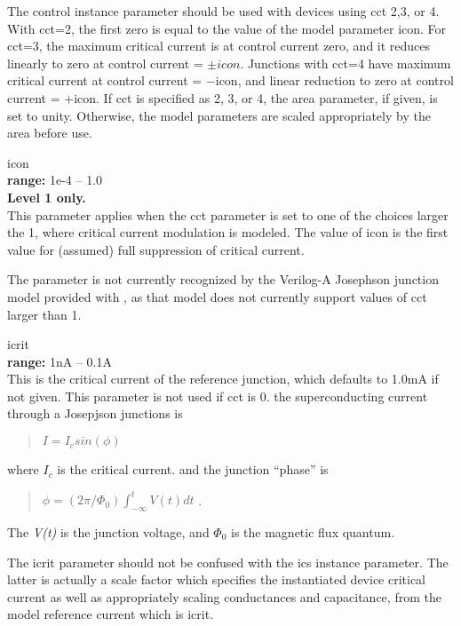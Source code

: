 \begin{description}
The {\vt control} instance parameter should be used with devices using
{\vt cct} 2,3, or 4.  With {\vt cct=2}, the first zero is equal to the
value of the model parameter {\vt icon}.  For {\vt cct=3}, the maximum
critical current is at control current zero, and it reduces linearly
to zero at control current = $\pm icon$.  Junctions with {\vt cct=4}
have maximum critical current at control current = $-${\vt icon}, and
linear reduction to zero at control current = $+${\vt icon}.  If {\vt
cct} is specified as 2, 3, or 4, the area parameter, if given, is set
to unity.  Otherwise, the model parameters are scaled appropriately by
the area before use.

\item{\vt icon}\\
{\bf range:} 1e-4 -- 1.0\\
{\bf Level 1 only.}\\
This parameter applies when the {\vt cct} parameter is set to one of
the choices larger the 1, where critical current modulation is
modeled.  The value of {\vt icon} is the first value for (assumed)
full suppression of critical current.

The parameter is not currently recognized by the Verilog-A Josephson
junction model provided with {\WRspice}, as that model does not
currently support values of {\vt cct} larger than 1.

\item{\vt icrit}\\
{\bf range:} 1nA -- 0.1A\\
This is the critical current of the reference junction, which defaults
to 1.0mA if not given.  This parameter is not used if {\vt cct} is 0.
the superconducting current through a Josepjson junctions is
\begin{quote}
$I = I_c sin(\phi)$
\end{quote}
where $I_c$ is the critical current. and the junction ``phase'' is
\begin{quote}
$\phi = (2\pi/\Phi_0)\int^t_{-\infty} V(t)dt$ .
\end{quote}
The {\it V(t)} is the junction voltage, and $\Phi_0$ is the magnetic
flux quantum.

The {\vt icrit} parameter should not be confused with the
{\vt ics} instance parameter.  The latter is actually a scale
factor which specifies the instantiated device critical current as
well as appropriately scaling conductances and capacitance, from
the model reference current which is {\vt icrit}.


\end{description}
